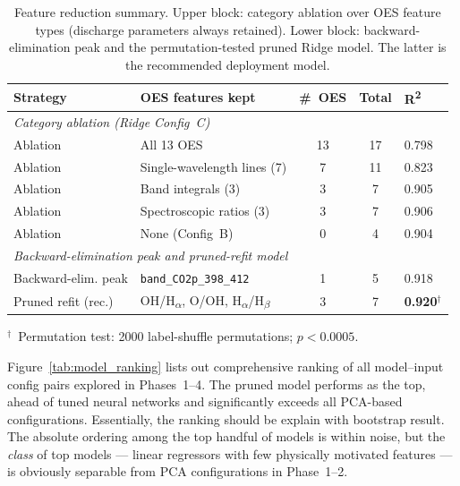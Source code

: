 \documentclass[12pt, a4paper]{article}
\begin{document}
\begin{table}[H]
    \centering
    \small
    \caption{Feature reduction summary. Upper block: category ablation over OES feature types (discharge parameters always retained). Lower block: backward-elimination peak and the permutation-tested pruned Ridge model. The latter is the recommended deployment model.}
    \label{tab:ablation}
    \begin{tabular}{llccl}
        \toprule
        \textbf{Strategy} & \textbf{OES features kept} & \textbf{\#~OES} & \textbf{Total} & \textbf{R\textsuperscript{2}} \\
        \midrule
        \multicolumn{5}{l}{\emph{Category ablation (Ridge Config~C)}} \\
        Ablation & All 13 OES                  & 13 & 17 & 0.798 \\
        Ablation & Single-wavelength lines (7) &  7 & 11 & 0.823 \\
        Ablation & Band integrals (3)          &  3 &  7 & 0.905 \\
        Ablation & Spectroscopic ratios (3)    &  3 &  7 & 0.906 \\
        Ablation & None (Config~B)             &  0 &  4 & 0.904 \\
        \midrule
        \multicolumn{5}{l}{\emph{Backward-elimination peak and pruned-refit model}} \\
        Backward-elim. peak & \texttt{band\_CO2p\_398\_412}            & 1 & 5 & 0.918 \\
        Pruned refit (rec.) & OH/H\textsubscript{$\alpha$}, O/OH, H\textsubscript{$\alpha$}/H\textsubscript{$\beta$} & 3 & 7 & \textbf{0.920}$^{\dagger}$ \\
        \bottomrule
    \end{tabular}

    \vspace{0.3em}
    {\footnotesize $^{\dagger}$~Permutation test: 2000 label-shuffle permutations; $p < 0.0005$.}
\end{table}


Figure~\ref{tab:model_ranking} lists out comprehensive ranking of all model--input config pairs explored in Phases~1--4. The pruned model performs as the top, ahead of tuned neural networks and significantly exceeds all PCA-based configurations. Essentially, the ranking should be explain with bootstrap result. The absolute ordering among the top handful of models is within noise, but the \emph{class} of top models --- linear regressors with few physically motivated features --- is obviously separable from PCA configurations in Phase~1--2. 
\end{document}

